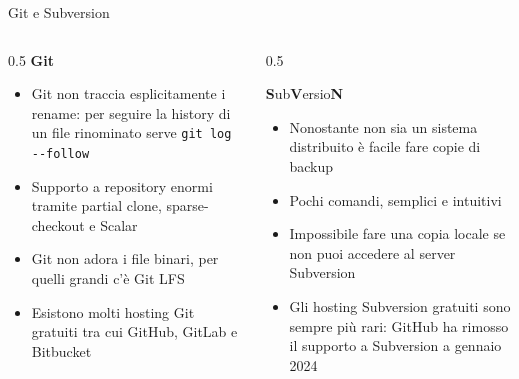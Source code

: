 \documentclass[aspectratio=169,handout,10pt]{beamer}
\begin{document}
\begin{frame}[fragile]{Git e Subversion}
    \begin{columns}
        \begin{column}{0.5\textwidth}
            \textbf{Git}
            \begin{itemize}
                \item Git non traccia esplicitamente i rename: per seguire la history di un file rinominato serve \lstinline{git log --follow}
                \item Supporto a repository enormi tramite partial clone, sparse-checkout e Scalar
                \item Git non adora i file binari, per quelli grandi c'è Git LFS
                \item Esistono molti hosting Git gratuiti tra cui GitHub, GitLab e Bitbucket
                      
            \end{itemize}
            
            
        \end{column}
        \begin{column}{0.5\textwidth}
            
            \textbf{S}ub\textbf{V}ersio\textbf{N} 
            \begin{itemize}
                \item Nonostante non sia un sistema distribuito è facile fare copie di backup 
                \item Pochi comandi, semplici e intuitivi
                \item Impossibile fare una copia locale se non puoi accedere al server Subversion
                \item Gli hosting Subversion gratuiti sono sempre più rari: GitHub ha rimosso il supporto a Subversion a gennaio 2024
                      
            \end{itemize}
            
            
        \end{column}
    \end{columns}
\end{frame}
\end{document}
